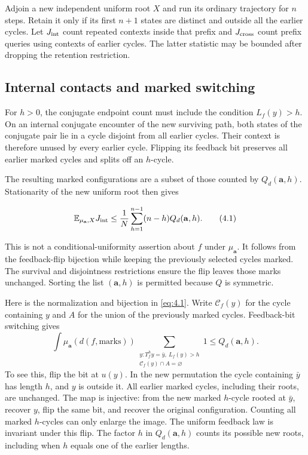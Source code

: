 \documentclass[11pt]{article}
\theoremstyle{remark}
\begin{document}
Adjoin a new independent uniform root \(X\) and run its ordinary
trajectory for \(n\) steps. Retain it only if its first \(n+1\) states
are distinct and outside all the earlier cycles. Let \(J_{\rm int}\)
count repeated contexts inside that prefix and \(J_{\rm cross}\) count
prefix queries using contexts of earlier cycles. The latter statistic
may be bounded after dropping the retention restriction.

\subsection{Internal contacts and marked
switching}\label{internal-contacts-and-marked-switching}

For \(h>0\), the conjugate endpoint count must include the condition
\(L_f(y)>h\). On an internal conjugate encounter of the new surviving
path, both states of the conjugate pair lie in a cycle disjoint from all
earlier cycles. Their context is therefore unused by every earlier
cycle. Flipping its feedback bit preserves all earlier marked cycles and
splits off an \(h\)-cycle.

The resulting marked configurations are a subset of those counted by
\(Q_d(\mathbf a,h)\). Stationarity of the new uniform root then gives

\[
 \mathbb E_{\mu_{\mathbf a},X}J_{\rm int}
 \le\frac1N\sum_{h=1}^{n-1}(n-h)Q_d(\mathbf a,h).
 \tag{4.1}\label{eq:4.1}
\]

This is not a conditional-uniformity assertion about \(f\) under
\(\mu_{\mathbf a}\). It follows from the feedback-flip bijection while
keeping the previously selected cycles marked. The survival and
disjointness restrictions ensure the flip leaves those marks unchanged.
Sorting the list \(({\mathbf a},h)\) is permitted because \(Q\) is
symmetric.

Here is the normalization and bijection in \eqref{eq:4.1}. Write
\(\mathcal C_f(y)\) for the cycle containing \(y\) and \(A\) for the
union of the previously marked cycles. Feedback-bit switching gives \[
 \int\!\mu_{\mathbf a}(d(f,\text{marks}))
 \sum_{\substack{y:T_f^hy=\bar y,\ L_f(y)>h\\
                  \mathcal C_f(y)\cap A=\varnothing}}1
 \le Q_d(\mathbf a,h).
 \tag{4.1a}\label{eq:4.1a}
\] To see this, flip the bit at \(u(y)\). In the new permutation the
cycle containing \(\bar y\) has length \(h\), and \(y\) is outside it.
All earlier marked cycles, including their roots, are unchanged. The map
is injective: from the new marked \(h\)-cycle rooted at \(\bar y\),
recover \(y\), flip the same bit, and recover the original
configuration. Counting all marked \(h\)-cycles can only enlarge the
image. The uniform feedback law is invariant under this flip. The factor
\(h\) in \(Q_d(\mathbf a,h)\) counts its possible new roots, including
when \(h\) equals one of the earlier lengths.
\end{document}
